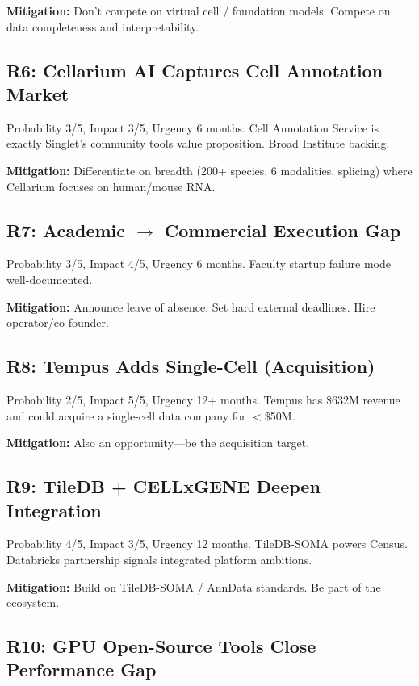 \documentclass[10pt,twocolumn,letterpaper]{article}
\begin{document}
\textbf{Mitigation:} Don't compete on virtual cell / foundation models.
Compete on data completeness and interpretability.

\subsection{R6: Cellarium AI Captures Cell Annotation Market}

Probability 3/5, Impact 3/5, Urgency 6 months. Cell Annotation Service is
exactly Singlet's community tools value proposition. Broad Institute backing.

\textbf{Mitigation:} Differentiate on breadth (200+ species, 6 modalities,
splicing) where Cellarium focuses on human/mouse RNA.

\subsection{R7: Academic $\to$ Commercial Execution Gap}

Probability 3/5, Impact 4/5, Urgency 6 months. Faculty startup failure mode
well-documented.

\textbf{Mitigation:} Announce leave of absence. Set hard external deadlines.
Hire operator/co-founder.

\subsection{R8: Tempus Adds Single-Cell (Acquisition)}

Probability 2/5, Impact 5/5, Urgency 12+ months. Tempus has \$632M revenue
and could acquire a single-cell data company for $<$\$50M.

\textbf{Mitigation:} Also an opportunity---be the acquisition target.

\subsection{R9: TileDB + CELLxGENE Deepen Integration}

Probability 4/5, Impact 3/5, Urgency 12 months. TileDB-SOMA powers Census.
Databricks partnership signals integrated platform ambitions.

\textbf{Mitigation:} Build on TileDB-SOMA / AnnData standards. Be part of
the ecosystem.

\subsection{R10: GPU Open-Source Tools Close Performance Gap}
\end{document}
